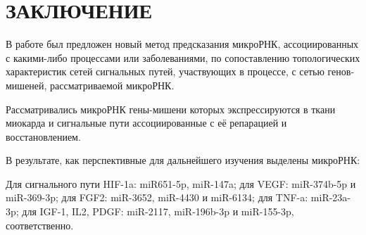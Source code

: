 \section{ЗАКЛЮЧЕНИЕ}

В работе был предложен новый метод предсказания микроРНК, ассоциированных с какими-либо процессами или заболеваниями, по сопоставлению топологических характеристик сетей сигнальных путей, участвующих в процессе, с сетью генов-мишеней, рассматриваемой микроРНК.

Рассматривались микроРНК гены-мишени которых экспрессируются в ткани миокарда и сигнальные пути ассоциированные с её репарацией и восстановлением.

В результате, как перспективные для дальнейшего изучения выделены микроРНК:

Для сигнального пути HIF-1a: miR651-5p, miR-147a; для VEGF: miR-374b-5p и miR-369-3p; для FGF2: miR-3652, miR-4430 и miR-6134; для TNF-a: miR-23a-3p; для  IGF-1, IL2, PDGF: miR-2117, miR-196b-3p и miR-155-3p, соответственно.